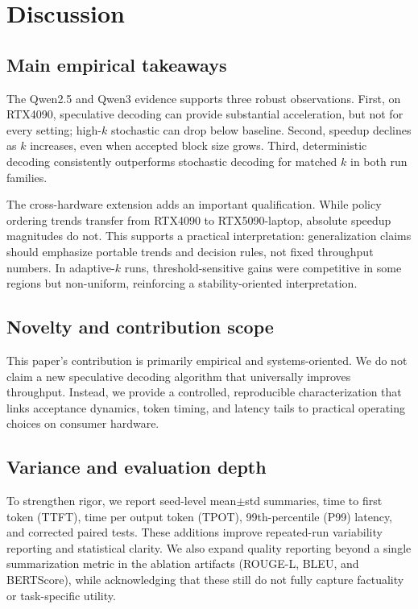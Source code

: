 \section{Discussion}
\label{sec:discussion}

\subsection{Main empirical takeaways}

The Qwen2.5 and Qwen3 evidence supports three robust observations.
First, on RTX4090, speculative decoding can provide substantial acceleration,
but not for every setting; high-$k$ stochastic can drop below baseline.
Second, speedup declines as $k$ increases, even when accepted block size grows.
Third, deterministic decoding consistently outperforms stochastic decoding
for matched $k$ in both run families.

The cross-hardware extension adds an important qualification.
While policy ordering trends transfer from RTX4090 to RTX5090-laptop,
absolute speedup magnitudes do not.
This supports a practical interpretation: generalization claims should emphasize
portable trends and decision rules, not fixed throughput numbers.
In adaptive-$k$ runs, threshold-sensitive gains were competitive in some
regions but non-uniform, reinforcing a stability-oriented interpretation.

\subsection{Novelty and contribution scope}

This paper's contribution is primarily empirical and systems-oriented.
We do not claim a new speculative decoding algorithm that universally
improves throughput.
Instead, we provide a controlled, reproducible characterization that links
acceptance dynamics, token timing, and latency tails to practical operating
choices on consumer hardware.

\subsection{Variance and evaluation depth}

To strengthen rigor, we report seed-level mean$\pm$std summaries,
time to first token (TTFT), time per output token (TPOT), 99th-percentile
(P99) latency, and corrected paired tests.
These additions improve repeated-run variability reporting and statistical clarity.
We also expand quality reporting beyond a single summarization metric in the
ablation artifacts (ROUGE-L, BLEU, and BERTScore), while acknowledging that
these still do not fully capture factuality or task-specific utility.


